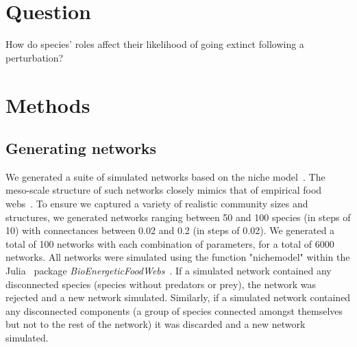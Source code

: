 \documentclass[12pt]{article}
\begin{document}
\section*{Question}

	How do species' roles affect their likelihood of going extinct following a perturbation? 



\section*{Methods}

	\subsection*{Generating networks}

		We generated a suite of simulated networks based on the niche model~\citep{Williams2000}. The meso-scale structure of such networks closely mimics that of empirical food webs~\citep{Stouffer2007}. To ensure we captured a variety of realistic community sizes and structures, we generated networks ranging between 50 and 100 species (in steps of 10) with connectances between 0.02 and 0.2 (in steps of 0.02). We generated a total of 100 networks with each combination of parameters, for a total of 6000 networks. All networks were simulated using the function "nichemodel" within the Julia~\citep{Julia} package \emph{BioEnergeticFoodWebs}~\citep{bioenergfw}. If a simulated network contained any disconnected species (species without predators or prey), the network was rejected and a new network simulated. Similarly, if a simulated network contained any disconnected components (a group of species connected amongst themselves but not to the rest of the network) it was discarded and a new network simulated.
\end{document}

